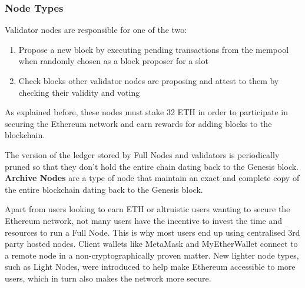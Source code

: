 
\subsubsection{Node Types}

Validator nodes are responsible for one of the two:
\begin{enumerate}
    \item Propose a new block by executing pending transactions from the mempool when randomly chosen as a block proposer for a slot
    \item Check blocks other validator nodes are proposing and attest to them by checking their validity and voting 
\end{enumerate}
As explained before, these nodes must stake 32 ETH in order to participate in securing the Ethereum network and earn rewards for adding blocks to the blockchain.

The version of the ledger stored by Full Nodes and validators is periodically pruned so that they don't hold the entire chain dating back to the Genesis block. \textbf{Archive Nodes} are a type of node that maintain an exact and complete copy of the entire blockchain dating back to the Genesis block. 

Apart from users looking to earn ETH or altruistic users wanting to secure the Ethereum network, not many users have the incentive to invest the time and resources to run a Full Node. This is why most users end up using centralised 3rd party hosted nodes. Client wallets like MetaMask and MyEtherWallet connect to a remote node in a non-cryptographically proven matter. New lighter node types, such as Light Nodes, were introduced to help make Ethereum accessible to more users, which in turn also makes the network more secure.



